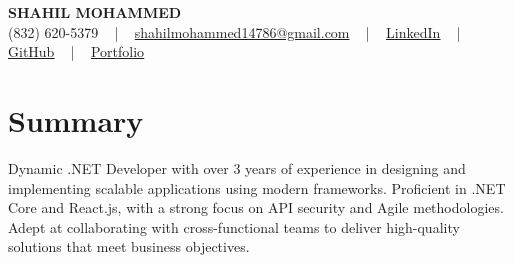 \documentclass[letterpaper,10pt]{article}
\begin{document}
\begin{center}
    {\fontsize{14pt}{12pt}\selectfont \textbf{\MakeUppercase{Shahil Mohammed}}}\\ \vspace{2pt}
    \fontsize{10pt}{12pt}\selectfont (832) 620-5379 ~ | ~ \href{mailto:shahilmohammed14786@gmail.com}{shahilmohammed14786@gmail.com} ~ | ~  
    \href{https://www.linkedin.com/in/shahil-mohammed-9652931a1/}{\color{blue}\underline{LinkedIn}}  ~ | ~ 
    \href{https://github.com/freakbeast14}{\color{blue}\underline{GitHub}} ~ | ~ 
    \href{https://shahil-mohammed.netlify.app/}{\color{blue}\underline{Portfolio}}
    \vspace{-8pt}
\end{center}

\section{Summary}
\vspace{-2pt}\fontsize{8pt}{9pt}\selectfont
Dynamic .NET Developer with over 3 years of experience in designing and implementing scalable applications using modern frameworks. Proficient in .NET Core and React.js, with a strong focus on API security and Agile methodologies. Adept at collaborating with cross-functional teams to deliver high-quality solutions that meet business objectives. 

\vspace{-5pt}
 
\vspace{-2pt}
\end{document}
